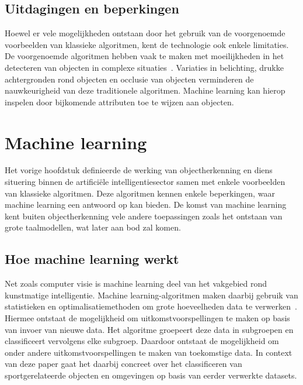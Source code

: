 \subsection{Uitdagingen en beperkingen}
\label{subsec:uitdagingen-en-beperkingen}
Hoewel er vele mogelijkheden ontstaan door het gebruik van de voorgenoemde voorbeelden van klassieke algoritmen, kent de technologie ook enkele limitaties.
De voorgenoemde algoritmen hebben vaak te maken met moeilijkheden in het detecteren van objecten in complexe situaties~\autocite{Luz2024}.
Variaties in belichting, drukke achtergronden rond objecten en occlusie van objecten verminderen de nauwkeurigheid van deze traditionele algoritmen.
Machine learning kan hierop inspelen door bijkomende attributen toe te wijzen aan objecten.

\section{Machine learning}\label{sec:datasets}
Het vorige hoofdstuk definieerde de werking van objectherkenning en diens situering binnen de artifici\"ele intelligentiesector samen met enkele voorbeelden van klassieke algoritmen.
Deze algoritmen kennen enkele beperkingen, waar machine learning een antwoord op kan bieden.
De komst van machine learning kent buiten objectherkenning vele andere toepassingen zoals het ontstaan van grote taalmodellen, wat later aan bod zal komen.

\subsection{Hoe machine learning werkt}
\label{subsec:hoe-deep-learning-werkt}
Net zoals computer visie is machine learning deel van het vakgebied rond kunstmatige intelligentie.
Machine learning-algoritmen maken daarbij gebruik van statistieken en optimalisatiemethoden om grote hoeveelheden data te verwerken~\autocite{Pennone2024}.
Hiermee ontstaat de mogelijkheid om uitkomstvoorspellingen te maken op basis van invoer van nieuwe data.
Het algoritme groepeert deze data in subgroepen en classificeert vervolgens elke subgroep.
Daardoor ontstaat de mogelijkheid om onder andere uitkomstvoorspellingen te maken van toekomstige data.
In context van deze paper gaat het daarbij concreet over het classificeren van sportgerelateerde objecten en omgevingen op basis van eerder verwerkte datasets.


